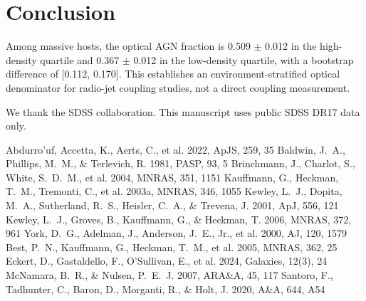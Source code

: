 \documentclass[twocolumn]{aastex631}
\begin{document}
\section{Conclusion}\label{sec:conclusion}
Among massive hosts, the optical AGN fraction is 0.509 $\pm$ 0.012 in the high-density quartile and 0.367 $\pm$ 0.012 in the low-density quartile, with a bootstrap difference of [0.112, 0.170]. This establishes an environment-stratified optical denominator for radio-jet coupling studies, not a direct coupling measurement.

\acknowledgments
We thank the SDSS collaboration. This manuscript uses public SDSS DR17 data only.


\begin{thebibliography}{}
 Abdurro'uf, Accetta, K., Aerts, C., et al. 2022, ApJS, 259, 35
 Baldwin, J.~A., Phillips, M.~M., \& Terlevich, R. 1981, PASP, 93, 5
 Brinchmann, J., Charlot, S., White, S.~D.~M., et al. 2004, MNRAS, 351, 1151
 Kauffmann, G., Heckman, T.~M., Tremonti, C., et al. 2003a, MNRAS, 346, 1055
 Kewley, L.~J., Dopita, M.~A., Sutherland, R.~S., Heisler, C.~A., \& Trevena, J. 2001, ApJ, 556, 121
 Kewley, L.~J., Groves, B., Kauffmann, G., \& Heckman, T. 2006, MNRAS, 372, 961
 York, D.~G., Adelman, J., Anderson, J.~E., Jr., et al. 2000, AJ, 120, 1579
 Best, P.~N., Kauffmann, G., Heckman, T.~M., et al. 2005, MNRAS, 362, 25
 Eckert, D., Gastaldello, F., O'Sullivan, E., et al. 2024, Galaxies, 12(3), 24
 McNamara, B.~R., \& Nulsen, P.~E.~J. 2007, ARA\&A, 45, 117
 Santoro, F., Tadhunter, C., Baron, D., Morganti, R., \& Holt, J. 2020, A\&A, 644, A54
\end{thebibliography}
\end{document}
